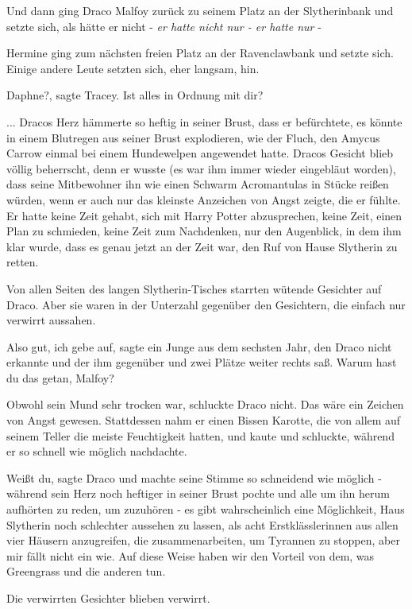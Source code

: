 Und dann ging Draco Malfoy zurück zu seinem Platz an der Slytherinbank und
setzte sich, als hätte er nicht -\emph{ er hatte nicht nur - er hatte nur }-

Hermine ging zum nächsten freien Platz an der Ravenclawbank und setzte sich.
Einige andere Leute setzten sich, eher langsam, hin.

\glqq Daphne?\grqq{}, sagte Tracey. \glqq Ist alles in Ordnung mit dir?\grqq{}

... Dracos Herz hämmerte so heftig in seiner Brust, dass er befürchtete, es
könnte in einem Blutregen aus seiner Brust explodieren, wie der Fluch, den
Amycus Carrow einmal bei einem Hundewelpen angewendet hatte. Dracos Gesicht
blieb völlig beherrscht, denn er wusste (es war ihm immer wieder eingebläut
worden), dass seine Mitbewohner ihn wie einen Schwarm Acromantulas in Stücke
reißen würden, wenn er auch nur das kleinste Anzeichen von Angst zeigte, die er
fühlte. Er hatte keine Zeit gehabt, sich mit Harry Potter abzusprechen, keine
Zeit, einen Plan zu schmieden, keine Zeit zum Nachdenken, nur den Augenblick, in
dem ihm klar wurde, dass es genau jetzt an der Zeit war, den Ruf von Hause
Slytherin zu retten.

Von allen Seiten des langen Slytherin-Tisches starrten wütende Gesichter auf
Draco. Aber sie waren in der Unterzahl gegenüber den Gesichtern, die einfach nur
verwirrt aussahen.

\glqq Also gut, ich gebe auf\grqq{}, sagte ein Junge aus dem sechsten Jahr, den
Draco nicht erkannte und der ihm gegenüber und zwei Plätze weiter rechts saß.
\glqq Warum hast du das getan, Malfoy?\grqq{}

Obwohl sein Mund sehr trocken war, schluckte Draco nicht. Das wäre ein Zeichen
von Angst gewesen. Stattdessen nahm er einen Bissen Karotte, die von allem auf
seinem Teller die meiste Feuchtigkeit hatten, und kaute und schluckte, während
er so schnell wie möglich nachdachte.

\glqq Weißt du\grqq{}, sagte Draco und machte seine Stimme so schneidend wie
möglich - während sein Herz noch heftiger in seiner Brust pochte und alle um ihn
herum aufhörten zu reden, um zuzuhören - \glqq es gibt wahrscheinlich eine
Möglichkeit, Haus Slytherin noch schlechter aussehen zu lassen, als acht
Erstklässlerinnen aus allen vier Häusern anzugreifen, die zusammenarbeiten, um
Tyrannen zu stoppen, aber mir fällt nicht ein wie. Auf diese Weise haben wir den
Vorteil von dem, was Greengrass und die anderen tun.\grqq{}

Die verwirrten Gesichter blieben verwirrt.

